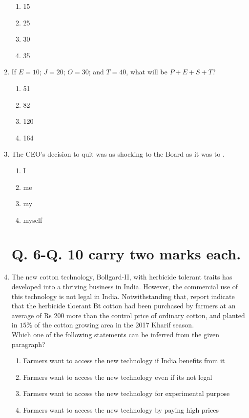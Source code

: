 \documentclass[journal,12pt,onecolumn]{IEEEtran}
\theoremstyle{remark}
\begin{document}
\begin{enumerate}
\hfill{}
\begin{enumerate}
\item 15
\item 25
\item 30
\item 35
\end{enumerate}

\item If $E=10$; $J=20$; $O=30$; and $T=40$, what will be $P+E+S+T$?

\hfill{}
\begin{enumerate}
\item 51
\item 82
\item 120
\item 164
\end{enumerate}

\item The CEO's decision to quit was as shocking to the Board as it was to \underline{\hspace{1cm}}.

\hfill{}
\begin{enumerate}
\item I
\item me
\item my
\item myself
\end{enumerate}

\section*{Q. 6-Q. 10 carry two marks each.}

\item The new cotton technology, Bollgard-II, with herbicide tolerant traits has developed into a thriving business in India. However, the commercial use of this technology is not legal in India. Notwithstanding that, report indicate that the herbicide tloerant Bt cotton had been purchased by farmers at an average of Rs 200 more than the control price of ordinary cotton, and planted in $15\%$ of the cotton growing area in the 2017 Kharif season.\\
Which one of the following statements can be inferred from the given paragraph?

\hfill{}
\begin{enumerate}
\item Farmers want to access the new technology if India benefits from it
\item Farmers want to access the new technology even if its not legal
\item Farmers want to access the new technology for experimental purpose
\item Farmers want to access the new technology by paying high prices
\end{enumerate}


\end{enumerate}
\end{document}
